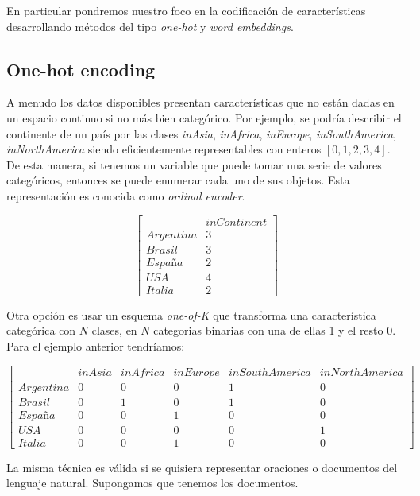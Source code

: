 En particular pondremos nuestro foco en la codificación de características
desarrollando métodos del tipo \emph{one-hot} y \emph{word embeddings}.

\subsection{One-hot encoding}

A menudo los datos disponibles presentan características que no están dadas en
un espacio continuo si no más bien categórico. Por ejemplo, se podría describir
el continente de un país por las clases \emph{inAsia}, \emph{inAfrica},
\emph{inEurope}, \emph{inSouthAmerica}, \emph{inNorthAmerica} siendo
eficientemente representables con enteros $[0, 1, 2, 3, 4]$. De esta manera, si
tenemos un variable que puede tomar una serie de valores categóricos, entonces se puede enumerar cada uno de sus objetos. Esta representación es conocida como \emph{ordinal encoder}.

\begin{equation*}
    \begin{bmatrix}
         & inContinent\\
        Argentina & 3 \\
        Brasil & 3 \\
        España & 2 \\
        USA & 4  \\
        Italia & 2 
    \end{bmatrix}
\end{equation*}

Otra opción es usar un esquema \emph{one-of-K} que
transforma una característica categórica con $N$ clases, en $N$ categorias
binarias con una de ellas 1 y el resto 0. Para el ejemplo anterior tendríamos:

\begin{equation*}
\begin{bmatrix}
    & inAsia & inAfrica & inEurope & inSouthAmerica & inNorthAmerica \\
    Argentina & 0 & 0 & 0 & 1 & 0 \\
    Brasil & 0 & 1 & 0 & 1 & 0 \\
    España & 0 & 0 & 1 & 0 & 0 \\
    USA & 0 & 0 & 0 & 0 & 1 \\
    Italia & 0 & 0 & 1 & 0 & 0
\end{bmatrix}
\end{equation*}

La misma técnica es válida si se quisiera representar oraciones o documentos del
lenguaje natural. Supongamos que tenemos los documentos.

